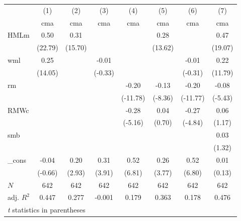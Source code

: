 \begin{tabular}{l*{7}{c}}
\hline\hline
          &\multicolumn{1}{c}{(1)}&\multicolumn{1}{c}{(2)}&\multicolumn{1}{c}{(3)}&\multicolumn{1}{c}{(4)}&\multicolumn{1}{c}{(5)}&\multicolumn{1}{c}{(6)}&\multicolumn{1}{c}{(7)}\\
          &\multicolumn{1}{c}{cma}&\multicolumn{1}{c}{cma}&\multicolumn{1}{c}{cma}&\multicolumn{1}{c}{cma}&\multicolumn{1}{c}{cma}&\multicolumn{1}{c}{cma}&\multicolumn{1}{c}{cma}\\
\hline
HMLm      &     0.50&     0.31&         &         &     0.28&         &     0.47\\
          &  (22.79)&  (15.70)&         &         &  (13.62)&         &  (19.07)\\
[1em]
wml       &     0.25&         &    -0.01&         &         &    -0.01&     0.22\\
          &  (14.05)&         &  (-0.33)&         &         &  (-0.31)&  (11.79)\\
[1em]
rm        &         &         &         &    -0.20&    -0.13&    -0.20&    -0.08\\
          &         &         &         & (-11.78)&  (-8.36)& (-11.77)&  (-5.43)\\
[1em]
RMWc      &         &         &         &    -0.28&     0.04&    -0.27&     0.06\\
          &         &         &         &  (-5.16)&   (0.70)&  (-4.84)&   (1.17)\\
[1em]
smb       &         &         &         &         &         &         &     0.03\\
          &         &         &         &         &         &         &   (1.32)\\
[1em]
\_cons    &    -0.04&     0.20&     0.31&     0.52&     0.26&     0.52&     0.01\\
          &  (-0.66)&   (2.93)&   (3.91)&   (6.81)&   (3.77)&   (6.80)&   (0.13)\\
\hline
\(N\)     &      642&      642&      642&      642&      642&      642&      642\\
adj. \(R^{2}\)&    0.447&    0.277&   -0.001&    0.179&    0.363&    0.178&    0.476\\
\hline\hline
\multicolumn{8}{l}{\footnotesize \textit{t} statistics in parentheses}\\
\end{tabular}
